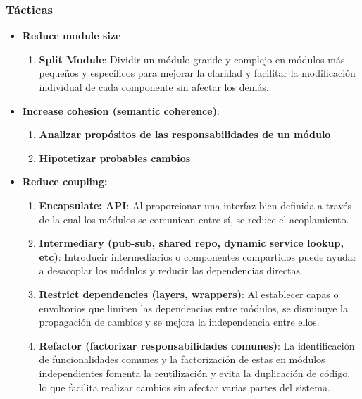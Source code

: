 \documentclass{article}
\begin{document}
		\subsubsection{Tácticas}
		\begin{itemize}		
			\item \textbf{Reduce module size}
			\begin{enumerate}
				\item \textbf{Split Module}: Dividir un módulo grande y complejo en módulos más pequeños y específicos para mejorar la claridad y facilitar la modificación individual de cada componente sin afectar los demás.
				
			\end{enumerate}
			
			\item \textbf{Increase cohesion (semantic coherence)}:
			\begin{enumerate}
				\item \textbf{Analizar propósitos de las
					responsabilidades de un módulo}
				
				\item \textbf{Hipotetizar probables cambios}
				
			\end{enumerate}	
			
			\item \textbf{Reduce coupling:}
			\begin{enumerate}
				\item \textbf{Encapsulate: API}: Al proporcionar una interfaz bien definida a través de la cual los módulos se comunican entre sí, se reduce el acoplamiento.
				
				\item \textbf{Intermediary (pub-sub, shared repo, dynamic service lookup, etc)}: Introducir intermediarios o componentes compartidos puede ayudar a desacoplar los módulos y reducir las dependencias directas.
				
					
				\item \textbf{Restrict dependencies (layers, wrappers)}: Al establecer capas o envoltorios que limiten las dependencias entre módulos, se disminuye la propagación de cambios y se mejora la independencia entre ellos.
					
				\item \textbf{Refactor (factorizar responsabilidades comunes)}: La identificación de funcionalidades comunes y la factorización de estas en módulos independientes fomenta la reutilización y evita la duplicación de código, lo que facilita realizar cambios sin afectar varias partes del sistema.
					

\end{enumerate}
\end{itemize}
\end{document}
